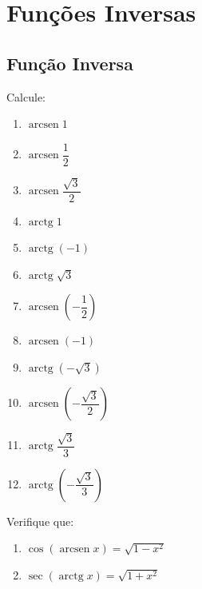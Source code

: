 \setcounter{section}{7}
\setcounter{subsection}{0}

\section{Funções Inversas}

\subsection{Função Inversa}

\begin{exercicio}[1]
Calcule:
\begin{enumerate}[label=\alph*)]
    \item $\operatorname{arcsen} 1$
    \item $\operatorname{arcsen} \dfrac{1}{2}$
    \item $\operatorname{arcsen} \dfrac{\sqrt{3}}{2}$
    \item $\operatorname{arctg} 1$
    \item $\operatorname{arctg} (-1)$
    \item $\operatorname{arctg} \sqrt{3}$
    \item $\operatorname{arcsen} \left(-\dfrac{1}{2}\right)$
    \item $\operatorname{arcsen} (-1)$
    \item $\operatorname{arctg} (-\sqrt{3})$
    \item $\operatorname{arcsen} \left(-\dfrac{\sqrt{3}}{2}\right)$
    \item $\operatorname{arctg} \dfrac{\sqrt{3}}{3}$
    \item $\operatorname{arctg} \left(-\dfrac{\sqrt{3}}{3}\right)$
\end{enumerate}
\end{exercicio}

\begin{exercicio}[2]
Verifique que:
\begin{enumerate}[label=\alph*)]
    \item $\cos (\operatorname{arcsen} x) = \sqrt{1 - x^2}$
    \item $\sec (\operatorname{arctg} x) = \sqrt{1 + x^2}$
\end{enumerate}
\end{exercicio}

